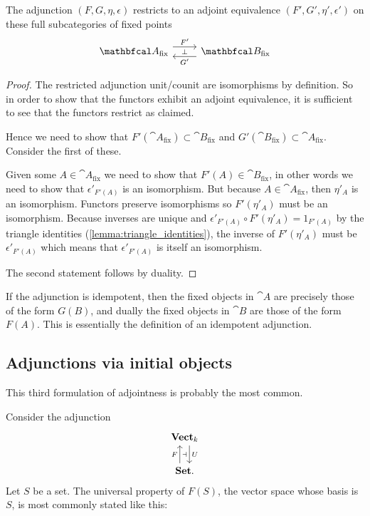 \begin{proposition}
    The adjunction $(F,G,\eta,\epsilon)$ restricts to an adjoint equivalence $(F',G',\eta',\epsilon')$ on these full subcategories of fixed points
    \begin{equation*}
    \begin{tikzcd}
        \cat{A}_{\text{fix}} \arrow[r, shift left=2, "F'"] &
        \cat{B}_{\text{fix}} \arrow[l, shift left=2, "G'", "\bot"']
    \end{tikzcd}
    \end{equation*}
\end{proposition}
\begin{proof}
    The restricted adjunction unit/counit are isomorphisms by definition. So in order to show that the functors exhibit an adjoint equivalence, it is sufficient to see that the functors restrict as claimed.\par
    Hence we need to show that $F'(\cat{A}_{\text{fix}}) \subset  \cat{B}_{\text{fix}}$ and $G'(\cat{B}_{\text{fix}}) \subset \cat{A}_{\text{fix}}$. Consider the first of these.\par
    Given some $A\in\cat{A}_{\text{fix}}$ we need to show that $F'(A)\in\cat{B}_{\text{fix}}$, in other words we need to show that $\epsilon'_{F'(A)}$ is an isomorphism. But because $A\in\cat{A}_{\text{fix}}$, then $\eta'_A$ is an isomorphism. Functors preserve isomorphisms so $F'(\eta'_A)$ must be an isomorphism. Because inverses are unique and $\epsilon'_{F'(A)} \circ F'(\eta'_A) = 1_{F'(A)}$ by the triangle identities (\ref{lemma:triangle_identities}), the inverse of $F'(\eta'_A)$ must be $\epsilon'_{F'(A)}$ which means that $\epsilon'_{F'(A)}$ is itself an isomorphism.\par
    The second statement follows by duality.
\end{proof}

If the adjunction is idempotent, then the fixed objects in $\cat{A}$ are precisely those of the form $G(B)$, and dually the fixed objects in $\cat{B}$ are those of the form $F(A)$. This is essentially the definition of an idempotent adjunction.

\subsection{Adjunctions via initial objects}
This third formulation of adjointness is probably the most common.\par
Consider the adjunction
\begin{equation*}
\begin{tikzcd}
    \bcat{Vect}_k \arrow[d, shift left=2, "U", "\dashv"'] \\
    \bcat{Set.} \arrow[u, shift left=2, "F"]
\end{tikzcd}
\end{equation*}
Let $S$ be a set. The universal property of $F(S)$, the vector space whose basis is $S$, is most commonly stated like this:\par

